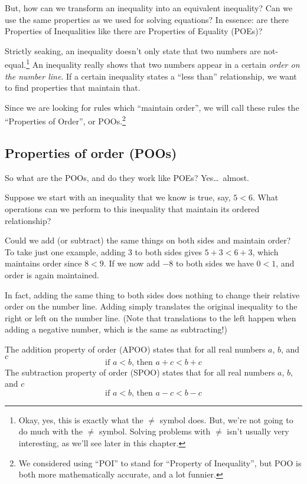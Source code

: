 But, how can we transform an inequality into an equivalent inequality? Can we use the same properties as we used for solving equations? In essence: are there Properties of Inequalities like there are Properties of Equality (POEs)?

Strictly seaking, an inequality doesn't only state that two numbers are not-equal.\footnote{Okay, yes, this is exactly what the $\neq$ symbol does. But, we're not going to do much with the $\neq$ symbol. Solving problems with $\neq$ isn't usually very interesting, as we'll see later in this chapter.} An inequality really shows that two numbers appear in a certain \textit{order on the number line}. If a certain inequality states a ``less than'' relationship, we want to find properties that maintain that.

Since we are looking for rules which ``maintain order'', we will call these rules the ``Properties of Order'', or POOs.\footnote{We considered using ``POI'' to stand for ``Property of Inequality'', but POO is both more mathematically accurate, and a lot funnier.}

\subsection{Properties of order (POOs)}

So what are the POOs, and do they work like POEs? Yes\ldots\ almost.

Suppose we start with an inequality that we know is true, say, $5 < 6$. What operations can we perform to this inequality that maintain its ordered relationship?

Could we add (or subtract) the same things on both sides and maintain order? To take just one example, adding 3 to both sides gives $5+3 < 6+3$, which maintains order since $8 < 9$. If we now add $-8$ to both sides we have $0<1$, and order is again maintained.

In fact, adding the same thing to both sides does nothing to change their relative order on the number line. Adding simply translates the original inequality to the right or left on the number line. (Note that translations to the left happen when adding a negative number, which is the same as subtracting!)

\begin{boxdef2col}
The \gls{addition property of order} (APOO) states that for all real numbers $a$, $b$, and $c$  \[\text{if } a < b \text{, then } a + c < b + c\]
\tcblower
The \gls{subtraction property of order} (SPOO) states that for all real numbers $a$, $b$, and $c$  \[\text{if } a < b \text{, then } a - c < b - c\]
\end{boxdef2col}

